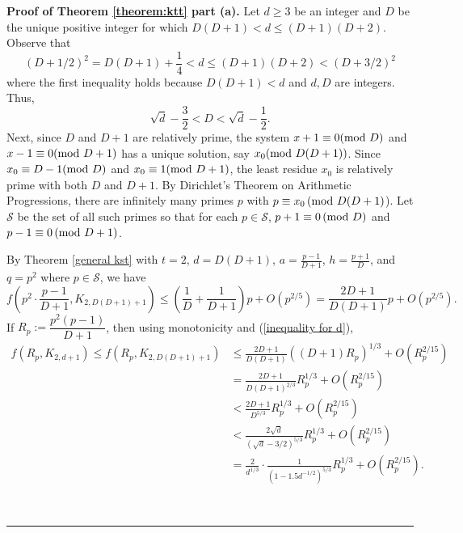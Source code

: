 \documentclass[12pt]{article}%
\newenvironment{proof}[1][Proof]{\noindent\textbf{#1.} }
{\hfill \ \rule{0.5em}{0.5em}}
\begin{document}
\bigskip

\noindent
\begin{proof}[Proof of Theorem \ref{theorem:ktt} part (a)]
Let $d \geq 3$ be an integer and $D$ be the unique 
positive integer for which $D(D+1) < d \leq (D+1)(D+2)$.  
Observe that 
\[
(D+1/2)^2  = D(D+1) + \frac{1}{4}  < d \leq (D+1)(D+2) < ( D+ 3/2)^2
\]
where the first inequality holds because $D(D+1) < d$ and $d,D$ are integers.  Thus,
\begin{equation}\label{inequality for d}
\sqrt{d} - \frac{3}{2} < D < \sqrt{d} - \frac{1}{2}.
\end{equation}
Next, since $D$ and $D+1$ are relatively prime, the system $x + 1 \equiv 0 ( \textup{mod} ~D)$ and $x - 1 \equiv 0 ( \textup{mod}~D+1)$ has a unique solution, say $x_0 ( \textup{mod}~D (D+1) )$.  Since $x_0 \equiv D-1 ( \textup{mod}~D)$ and $x_0 \equiv 1 ( \textup{mod}~D+1)$, the least residue $x_0$ is relatively prime with both $D$ and $D+1$.  By Dirichlet's Theorem on Arithmetic Progressions, there are infinitely many primes $p$ with 
$p \equiv x_0\, (\textup{mod}~D(D+1)$).  Let $\mathcal{S}$ be the set of all such primes so that for each $p \in \mathcal{S}$, $p +1 \equiv 0 \,( \textup{mod}~D)$ and $p-1 \equiv 0  \,( \textup{mod}~D+1)$.


By Theorem \ref{general kst} with $t = 2$, $d = D(D+1)$, $a = \frac{p-1}{D+1}$, $h = \frac{p+1}{D}$, and $q = p^2$ where $p \in \mathcal{S}$, we have 
\[
f\left( p^2 \cdot \frac{ p-1}{ D+1}  , K_{2,D(D+1)+1} \right) 
\leq \left( \dfrac{1}{ D} + \dfrac{1}{D+1} \right)
p + O( p^{2/5} )
=
\frac{2D+1}{D(D+1) } p + O ( p^{2/5} ).  
\]
If $R_p := \dfrac{p^2 ( p - 1) }{D+1}$, then using monotonicity and (\ref{inequality for d}),  
\begin{align*}
f ( R_p , K_{2, d +1 } )  \leq 
f ( R_p , K_{2, D (D+1) +1 } ) 
& \leq \frac{2D+1}{D (D+1) }( ( D+1) R_p)^{1/3}     + O  ( R_p^{2/15} ) \\
& = \frac{ 2D+1}{ D ( D+ 1)^{2/3} } R_p^{1/3} + O( R_p^{2/15} ) \\
&< \frac{ 2D+1}{ D^{5/3} } R_p^{1/3} + O( R_p^{2/15} ) \\
& < \frac{ 2 \sqrt{d} } { (  \sqrt{d} - 3/2 )^{5/3} } R_p^{1/3} + O(R_p^{2/15}) \\ 
&=  \frac{2}{d^{1/3}} \cdot 
\frac{1}{ (1 - 1.5d^{-1/2} )^{5/3} }  R_p^{1/3} + O( R_p^{2/15} ). 
\end{align*}


\end{proof}
\end{document}
